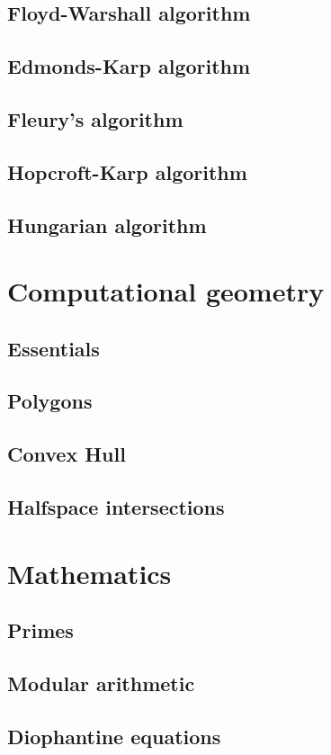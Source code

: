 \documentclass[a4paper]{article}
\begin{document}
	\subsection{Floyd-Warshall algorithm}
	\subsection{Edmonds-Karp algorithm}
	\subsection{Fleury's algorithm}
	\subsection{Hopcroft-Karp algorithm}
	\subsection{Hungarian algorithm}
	\section{Computational geometry}
	\subsection{Essentials}
	\subsection{Polygons}
	\subsection{Convex Hull}
	\subsection{Halfspace intersections}
	\section{Mathematics}
	\subsection{Primes}
	\subsection{Modular arithmetic}
	\subsection{Diophantine equations}
\end{document}

